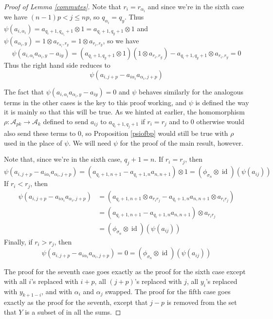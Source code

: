 \documentclass[11pt]{amsart}
\def\ltblue{blue!20!white}
\def\A{{\mathcal A}}
\def\s{{\sigma}}
\def\a{\alpha}
\newcommand\id{\operatorname{id}}
\newenvironment{rem}[1][Remark]{\begin{trivlist}
\item[\hskip \labelsep {\bfseries #1}]}{\end{trivlist}}
\begin{document}
\begin{proof} [Proof of Lemma \ref{commutes}]
Note that $r_i = r_{\a_i}$ and since we're in the sixth case we have $(n-1)p<j\le np$, so $q_{\a_i}=q_y$.  Thus $\psi(a_{i,\a_i}) = a_{q_i+1,q_{\a_i}+1}\otimes 1 = a_{q_i+1,q_y+1}\otimes 1$ and $\psi(a_{\a_i,y}) = 1\otimes a_{r_{\a_i},r_y} = 1\otimes a_{r_i,r_y}$, so we have
$$\psi(a_{i,\a_i}a_{\a_i,y} - a_{iy}) = \left(a_{q_i+1,q_y+1}\otimes 1\right)\left(1\otimes a_{r_i,r_y}\right) - a_{q_i+1,q_y+1}\otimes a_{r_i,r_y} = 0$$
Thus the right hand side reduces to 
$$\psi\left(a_{i,j+p} - a_{i\a_i}a_{\a_i,j+p}\right)$$

\begin{rem}
The fact that $\psi(a_{i,\a_i}a_{\a_i,y} - a_{iy}) = 0$ and $\psi$ behaves similarly for the analogous terms in the other cases is the key to this proof working, and $\psi$ is defined the way it is mainly so that this will be true.  As we hinted at earlier, the homomorphism $\rho\colon \A_{pk}\rightarrow \A_k$ defined to send $a_{ij}$ to $a_{q_i+1,q_j+1}$ if $r_i=r_j$ and to 0 otherwise would also send these terms to 0, so Proposition \ref{psiofbp} would still be true with $\rho$ used in the place of $\psi$.  We will need $\psi$ for the proof of the main result, however.
\end{rem}

\noindent Note that, since we're in the sixth case, $q_j + 1 = n$.  If $r_i = r_j$, then 
$$\psi\left(a_{i,j+p} - a_{i\a_i}a_{\a_i,j+p}\right) = \left(a_{q_i+1,n+1} - a_{q_i+1,n}a_{n,n+1}\right)\otimes 1 = (\phi_{\s_n} \otimes \id)(\psi(a_{ij}))$$
If $r_i < r_j$, then
\begin{align*}
\psi\left(a_{i,j+p} - a_{i\a_i}a_{\a_i,j+p}\right) &= \left(a_{q_i+1,n+1}\otimes a_{r_ir_j} - a_{q_i+1,n}a_{n,n+1}\otimes a_{r_ir_j}\right)\\
&= \left(a_{q_i+1,n+1} - a_{q_i+1,n}a_{n,n+1}\right)\otimes a_{r_ir_j}\\
&= (\phi_{\s_n} \otimes \id)(\psi(a_{ij}))
\end{align*}
Finally, if $r_i > r_j$, then
$$\psi\left(a_{i,j+p} - a_{i\a_i}a_{\a_i,j+p}\right) = 0 = (\phi_{\s_n} \otimes \id)(\psi(a_{ij}))$$

The proof for the seventh case goes exactly as the proof for the sixth case except with all $i$'s replaced with $i+p$, all $(j+p)$'s replaced with $j$, all $y_i$'s replaced with $y_{k+1-i}$, and with $\a_i$ and $\a_j$ swapped.  The proof for the fifth case goes exactly as the proof for the seventh, except that $j-p$ is removed from the set that $Y$ is a subset of in all the sums.\todo[color=\ltblue]{check this}
\end{proof}
\end{document}
